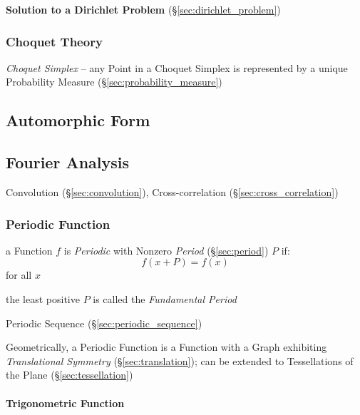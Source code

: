 \textbf{Solution to a Dirichlet Problem}
(\S\ref{sec:dirichlet_problem})



\subsubsection{Choquet Theory}\label{sec:choquet_theory}

\emph{Choquet Simplex} -- any Point in a Choquet Simplex is represented by a
unique Probability Measure (\S\ref{sec:probability_measure})



\subsection{Automorphic Form}\label{sec:automorphic_form}

\subsection{Fourier Analysis}\label{sec:fourier_analysis}

\fist Convolution (\S\ref{sec:convolution}), Cross-correlation
(\S\ref{sec:cross_correlation})



\subsubsection{Periodic Function}\label{sec:periodic_function}

a Function $f$ is \emph{Periodic} with Nonzero \emph{Period}
(\S\ref{sec:period}) $P$ if:
\[
  f(x+P) = f(x)
\]
for all $x$

the least positive $P$ is called the \emph{Fundamental Period}

\fist Periodic Sequence (\S\ref{sec:periodic_sequence})

Geometrically, a Periodic Function is a Function with a Graph exhibiting
\emph{Translational Symmetry} (\S\ref{sec:translation});
can be extended to Tessellations of the Plane (\S\ref{sec:tessellation})



\paragraph{Trigonometric Function}\label{sec:trigonometric_function}\hfill

